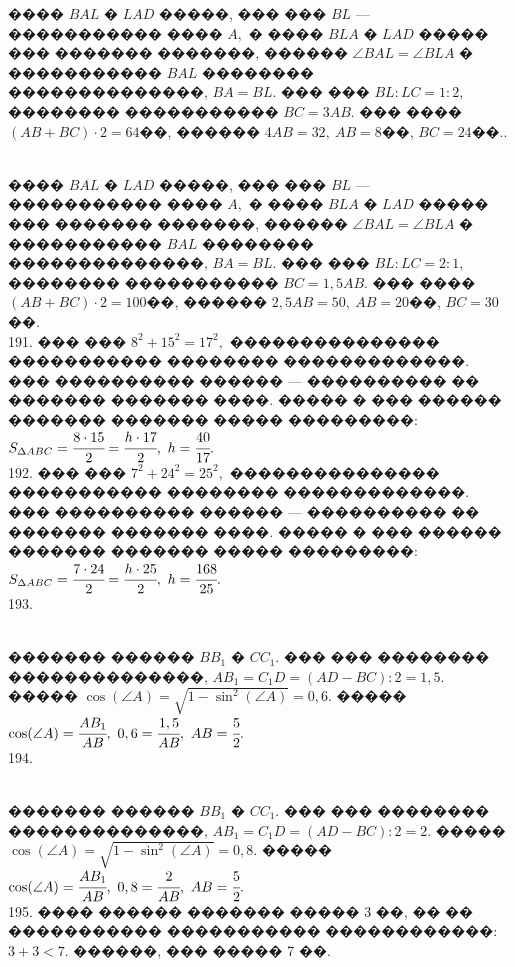 \documentclass[12pt]{article}
\begin{document}
���� $BAL$ � $LAD$ �����, ��� ��� $BL$ --- ����������� ���� $A,$ � ���� $BLA$ � $LAD$ ����� ��� ������� �������, ������ $\angle BAL=\angle BLA$ � ����������� $BAL$ �������� ��������������, $BA=BL.$ ��� ��� $BL:LC=1:2,$ �������� ����������� $BC=3AB.$ ��� ���� $(AB+BC)\cdot2=64$��, ������ $4AB=32,\ AB=8$��, $BC=24$��.\newpage{}. \begin{figure}[ht!]
\end{figure}\\
���� $BAL$ � $LAD$ �����, ��� ��� $BL$ --- ����������� ���� $A,$ � ���� $BLA$ � $LAD$ ����� ��� ������� �������, ������ $\angle BAL=\angle BLA$ � ����������� $BAL$ �������� ��������������, $BA=BL.$ ��� ��� $BL:LC=2:1,$ �������� ����������� $BC=1,5AB.$ ��� ���� $(AB+BC)\cdot2=100$��, ������ $2,5AB=50,\ AB=20$��, $BC=30$��.\\
191. ��� ��� $8^2+15^2=17^2,$ ��������������� ����������� �������� �������������. ��� ���������� ������ --- ���������� �� ������� ������� ����. ����� � ��� ������ ������� ������� ����� ���������: $S_{\Delta ABC}=\cfrac{8\cdot15}{2}=\cfrac{h\cdot17}{2},\ h=\cfrac{40}{17}.$\\
192. ��� ��� $7^2+24^2=25^2,$ ��������������� ����������� �������� �������������. ��� ���������� ������ --- ���������� �� ������� ������� ����. ����� � ��� ������ ������� ������� ����� ���������: $S_{\Delta ABC}=\cfrac{7\cdot24}{2}=\cfrac{h\cdot25}{2},\ h=\cfrac{168}{25}.$\\
193. \begin{figure}[ht!]
\end{figure}\\
������� ������ $BB_1$ � $CC_1.$ ��� ��� �������� ��������������, $AB_1=C_1D=(AD-BC):2=1,5.$ ����� $\cos(\angle A)=\sqrt{1-\sin^2(\angle A)}=0,6.$ �����
$\cos(\angle A)=\cfrac{AB_1}{AB},\ 0,6=\cfrac{1,5}{AB},\ AB=\cfrac{5}{2}.$\\
194. \begin{figure}[ht!]
\end{figure}\\
������� ������ $BB_1$ � $CC_1.$ ��� ��� �������� ��������������, $AB_1=C_1D=(AD-BC):2=2.$ ����� $\cos(\angle A)=\sqrt{1-\sin^2(\angle A)}=0,8.$ �����
$\cos(\angle A)=\cfrac{AB_1}{AB},\ 0,8=\cfrac{2}{AB},\ AB=\cfrac{5}{2}.$\\
195. ���� ������ ������� ����� 3 ��, �� �� ����������� ����������� ������������: $3+3<7.$ ������, ��� ����� 7 ��.\\
\end{document}
